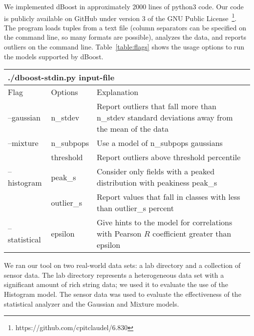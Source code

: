 
We implemented dBoost in approximately 2000 lines of python3 code.
Our code is publicly available on GitHub under version 3 of the GNU Public License~\footnote{https://github.com/cpitclaudel/6.830}.
The program loads tuples from a text file (column separators can be specified on the command line, so many formats are possible), analyzes the data, and reports outliers on the command line.
Table~\ref{table:flags} shows the usage options to run the models supported by dBoost.

\begin{table*}
\label{table:flags}
\caption{dBoost command line usage.}
\centering
\begin{tabular} { l | l | p{10cm} }
\multicolumn{3}{l}{./dboost-stdin.py input-file} \\
\hline
Flag & Options & Explanation \\
\hline
--gaussian & n\_stdev & Report outliers that fall more than n\_stdev standard deviations away from the mean of the data \\
--mixture & n\_subpops & Use a model of n\_subpops gaussians \\
  & threshold & Report outliers above threshold percentile \\
--histogram & peak\_s & Consider only fields with a peaked distribution with peakiness peak\_s \\
  & outlier\_s & Report values that fall in classes with less than outlier\_s percent \\
--statistical & epsilon & Give hints to the model for correlations with Pearson $R$ coefficient greater than epsilon \\
\end{tabular}
\end{table*}

We ran our tool on two real-world data sets: a lab directory and a collection of sensor data. The lab directory represents a heterogeneous data set with a significant amount of rich string data; we used it to evaluate the use of the Histogram model. The sensor data was used to evaluate the effectiveness of the statistical analyzer and the Gaussian and Mixture models.

